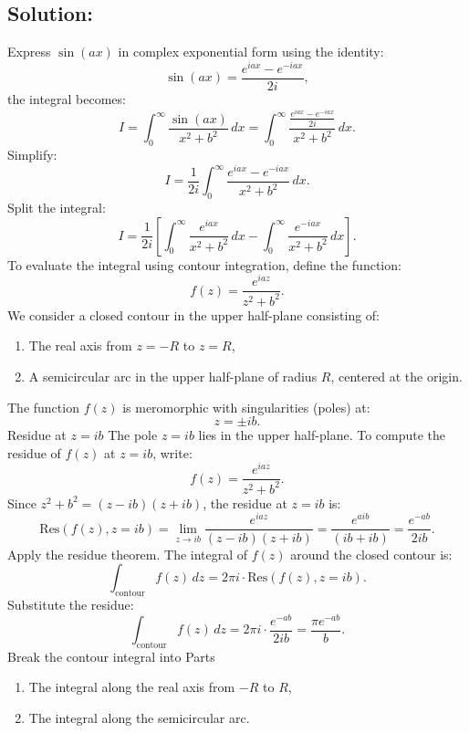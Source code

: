 \documentclass[12pt]{article}
\begin{document}
    \subsection*{Solution:}
        Express \(\sin(ax)\) in complex exponential form using the identity:
        \[
        \sin(ax) = \frac{e^{iax} - e^{-iax}}{2i},
        \]
        the integral becomes:
        \[
        I = \int_{0}^\infty \frac{\sin(ax)}{x^2 + b^2} \, dx = \int_{0}^\infty \frac{\frac{e^{iax} - e^{-iax}}{2i}}{x^2 + b^2} \, dx.
        \]
        Simplify:
        \[
        I = \frac{1}{2i} \int_{0}^\infty \frac{e^{iax} - e^{-iax}}{x^2 + b^2} \, dx.
        \]
        Split the integral:
        \[
        I = \frac{1}{2i} \left[\int_{0}^\infty \frac{e^{iax}}{x^2 + b^2} \, dx - \int_{0}^\infty \frac{e^{-iax}}{x^2 + b^2} \, dx\right].
        \]
        To evaluate the integral using contour integration, define the function:
        \[
        f(z) = \frac{e^{iaz}}{z^2 + b^2}.
        \]
        We consider a closed contour in the upper half-plane consisting of:
        \begin{enumerate}
            \item The real axis from \(z = -R\) to \(z = R\),
            \item A semicircular arc in the upper half-plane of radius \(R\), centered at the origin.
        \end{enumerate}
        The function \(f(z)\) is meromorphic with singularities (poles) at:
        \[
        z = \pm ib.
        \]
        Residue at \(z = ib\)
        The pole \(z = ib\) lies in the upper half-plane. To compute the residue of \(f(z)\) at \(z = ib\), write:
        \[
        f(z) = \frac{e^{iaz}}{z^2 + b^2}.
        \]
        Since \(z^2 + b^2 = (z - ib)(z + ib)\), the residue at \(z = ib\) is:
        \[
        \text{Res}(f(z), z = ib) = \lim_{z \to ib} \frac{e^{iaz}}{(z - ib)(z + ib)} = \frac{e^{aib}}{(ib + ib)} = \frac{e^{-ab}}{2ib}.
        \]
        Apply the residue theorem. The integral of \(f(z)\) around the closed contour is:
        \[
        \int_\text{contour} f(z) \, dz = 2\pi i \cdot \text{Res}(f(z), z = ib).
        \]
        Substitute the residue:
        \[
        \int_\text{contour} f(z) \, dz = 2\pi i \cdot \frac{e^{-ab}}{2ib} = \frac{\pi e^{-ab}}{b}.
        \]
        Break the contour integral into Parts
        \begin{enumerate}
            \item The integral along the real axis from \(-R\) to \(R\),
            \item The integral along the semicircular arc.
        \end{enumerate}
\end{document}
